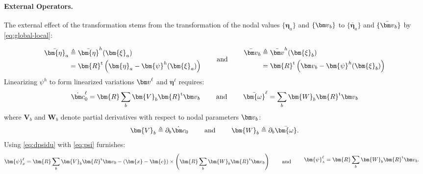 \hypertarget{external-operators}{%
\paragraph{External Operators.}\label{external-operators}}

The external effect of the transformation stems from the transformation
of the nodal values \(\{\bm{\eta}_a\}\) and \(\{\VarConfig_b\}\) to
\(\{\bar{\bm{\eta}}_a\}\) and \(\{\bar{\VarConfig}_b\}\) by
\eqref{eq:global-local}:

\begin{equation}
\begin{aligned}
\bar{\bm{\eta}}_a &\triangleq \bar{\bm{\eta}}^h(\bm{\xi}_a) \\
&=  \bm{R}^{\mathrm{t}} \left(\bm{\eta}_a - \bm{\psi}^h(\bm{\xi}_a)\right)
\end{aligned}
\qquad\text{ and }\qquad
\begin{aligned}
\bar{\VarConfig}_b &\triangleq \bar{\VarConfig}^h(\bm{\xi}_b) \\
&= \bm{R}^{\mathrm{t}} \left(\VarConfig_b - \bm{\psi}^h(\bm{\xi}_b)\right)
\end{aligned}
\label{eq:u-augmented}
\end{equation} 
Linearizing \(\psi^h\) to form linearized variations \(\VarConfig^\ell\) and \(\bm{\eta}^\ell\) requires:
%
\begin{equation}
\VarRigidTran^{\ell} = \bm{R} \sum_b \bm{V}_b\bm{R}^{\mathrm{t}}\VarConfig_b
\qquad\text{ and }\qquad
\bar{\bm{\omega}}^{\ell} = \sum_b \bm{W}_b \bm{R}^{\mathrm{t}}\VarConfig_b
\label{eq:dpsidu}
\end{equation} 
where \(\bm{V}_b\) and \(\bm{W}_b\) denote partial derivatives with respect to nodal parameters \(\VarConfig_b\): %
\begin{equation} 
\bm{V}_b \triangleq \partial_b \VarRigidTran
\qquad\text{ and }\qquad
\bm{W}_b \triangleq \partial_b \bar{\bm{\omega}}.
\end{equation}
Using \eqref{eq:dpsidu} with \eqref{eq:psi} furnishes:
\begin{equation*} 
\begin{aligned}
\bm{\psi}_x^{\ell} &= \bm{R} \sum_b \bm{V}_b\bm{R}^{\mathrm{t}} \VarConfig_b - \left(\bm{x}-\bm{c}\right)\times\left(\bm{R}\sum_b \bm{W}_b \bm{R}^{\mathrm{t}}\VarConfig_b\right) \\
\end{aligned}
\qquad\text{ and }\qquad
\begin{aligned}
\bm{\psi}^{\ell}_{\scriptscriptstyle{\Lambda}} &= \bm{R}\sum_b \bm{W}_b \bm{R}^{\mathrm{t}}\VarConfig_b .
\end{aligned}
\end{equation*}
